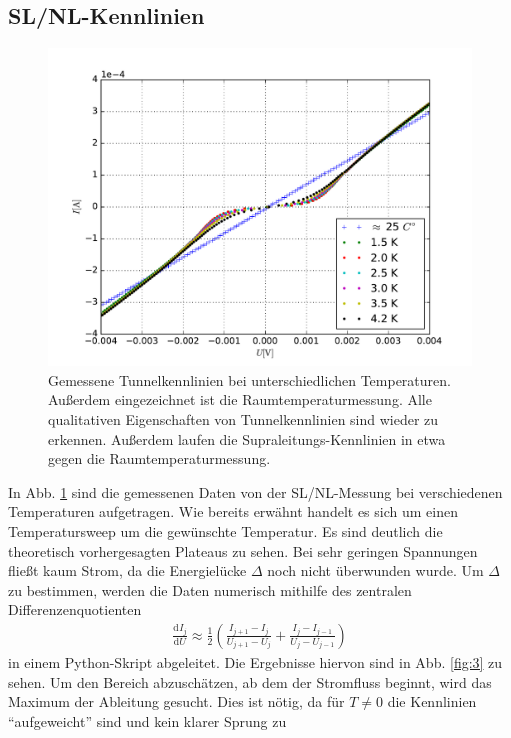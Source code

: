 \documentclass[twoside,        %
               BCOR12mm,       %
               english,ngerman, %
               fleqn,headsepline=false,footsepline=false
              ]{Vorlage/MFPREPORT}
\renewcommand{\d}{\ensuremath{\mathrm{d}}} %
\newcommand{\diff}[3][]{\ensuremath{\frac{\d^{#1}#2}{\d#3^{#1}}}} %
\begin{document}
\subsection{SL/NL-Kennlinien}
\begin{figure}[h]
    \centering
    \includegraphics[width=\textwidth]{fig/2.pdf}
    \caption{Gemessene Tunnelkennlinien bei unterschiedlichen Temperaturen.
    Außerdem eingezeichnet ist die Raumtemperaturmessung. Alle qualitativen
    Eigenschaften von Tunnelkennlinien sind wieder zu erkennen. Außerdem laufen
    die Supraleitungs-Kennlinien in etwa gegen die Raumtemperaturmessung.}
    \label{fig:2}
\end{figure}
In Abb. \ref{fig:2} sind die gemessenen Daten von der SL/NL-Messung bei verschiedenen Temperaturen
aufgetragen. Wie bereits erwähnt handelt es sich um einen Temperatursweep um
die gewünschte Temperatur. Es sind deutlich die theoretisch vorhergesagten
Plateaus zu sehen. Bei sehr geringen Spannungen fließt kaum Strom, da die
Energielücke $\Delta$ noch nicht überwunden wurde. Um $\Delta$ zu bestimmen,
werden die Daten numerisch mithilfe des zentralen Differenzenquotienten
\begin{align}
    \diff{I_j}{U}\approx\frac{1}{2}\left(\frac{I_{j+1}-I_j}{U_{j+1}-U_{j}}+\frac{I_{j}-I_{j-1}}{U_{j}-U_{j-1}}\right)
    \label{eq:diffquot}
\end{align}
in einem Python-Skript abgeleitet. Die Ergebnisse hiervon sind in Abb.
\ref{fig:3} zu sehen. Um den Bereich abzuschätzen, ab dem der
Stromfluss beginnt, wird das Maximum der Ableitung gesucht. Dies ist nötig, da
für $T\neq0$ die Kennlinien ``aufgeweicht'' sind und kein klarer Sprung zu
\end{document}
